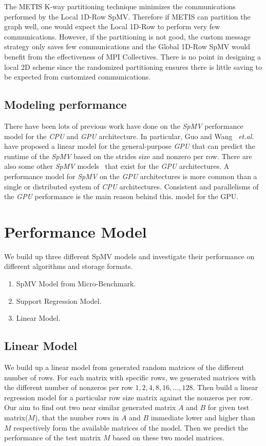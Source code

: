 \documentclass[sigconf,review,anonymous]{acmart}
\begin{document}
The METIS K-way partitioning technique minimizes the communications
performed by the Local 1D-Row SpMV. Therefore if METIS can partition
the graph well, one would expect the Local 1D-Row to perform very few
communications. However, if the partitioning is not good, the custom
message strategy only saves few communications and the Global 1D-Row
SpMV would benefit from the effectiveness of MPI Collectives. There is
no point in designing a local 2D scheme since the randomized
partitioning ensures there is little saving to be expected from
customized communications.

\subsection{Modeling performance}

There have been lots of previous work have done on the \textit{SpMV}
performance model for the \textit{CPU} and \textit{GPU}
architecture. In particular, Guo and Wang~\cite{guo2013performance}
\textit{et.al.} have proposed a linear model for the general-purpose
\textit{GPU} that can predict the runtime of the \textit{SpMV} based
on the strides size and nonzero per row. There are also some other
\textit{SpMV} models~\cite{nisa2018effective,guo2018performance} that
exist for the \textit{GPU} architectures. A performance model for
\textit{SpMV} on the \textit{GPU} architectures is more common than a
single or distributed system of \textit{CPU} architectures. Consistent
and parallelisms of the \textit{GPU} performance is the main reason
behind this.
model for the GPU. 


\section{Performance Model}
We build up three different SpMV models and investigate their performance on different algorithms and
storage formats.
\begin{enumerate}
\item SpMV Model from Micro-Benchmark.
\item Support Regression Model.
\item Linear Model.
\end{enumerate} 

\subsection{Linear Model}
\label{sec:linear-2d-spmv}
We build up a linear model from generated random matrices of the different
number of rows. For each matrix with specific rows, we generated
matrices with the different number of nonzeros per row $1, 2, 4, 8, 16,
\dots, 128$. Then build a linear regression model for a particular row
size matrix against the nonzeros per row. Our aim to find out two near
similar generated matrix $A$ and $B$ for given test matrix($M$), that
the number rows in $A$ and $B$ immediate lower and higher than $M$
respectively form the available matrices of the model. Then we predict
the performance of the test matrix $M$ based on these two model
matrices.
\end{document}
